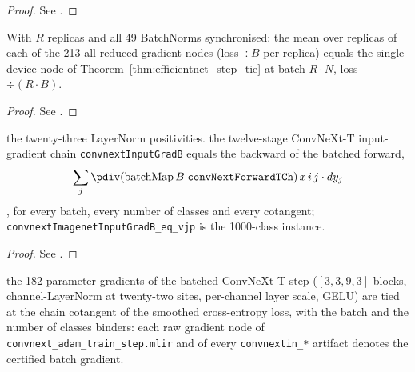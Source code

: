 \begin{proof}
\leanok
See .
\end{proof}

\begin{theorem}
  \label{thm:efficientnet_sync_tie}
  \leanok
  With \(R\) replicas and all 49 BatchNorms synchronised: \Prove{} the mean
  over replicas of each of the 213 all-reduced gradient nodes (loss \(\div B\)
  per replica) equals the single-device node of
  Theorem~\ref{thm:efficientnet_step_tie} at batch \(R \cdot N\), loss
  \(\div (R \cdot B)\).
\end{theorem}

\begin{proof}
\leanok
See .
\end{proof}

\begin{theorem}
  \label{thm:convnext_whole_back}
  \leanok
  \Assume{} the twenty-three LayerNorm positivities. \Prove{} the
  twelve-stage ConvNeXt-T input-gradient chain \texttt{convnextInputGradB}
  equals the backward of the batched forward,
  \[
    \sum_j \pdiv(\mathrm{batchMap}\, B\; \texttt{convNextForwardTCh})\, x\, i\, j
  \cdot dy_j
  \]
  , for every batch, every number of classes and every cotangent;
  \texttt{convnextImagenetInputGradB\_eq\_vjp} is the 1000-class instance.
\end{theorem}

\begin{proof}
\leanok
See .
\end{proof}

\begin{theorem}
  \label{thm:convnext_step_tie}
  \leanok
  \Prove{} the 182 parameter gradients of the batched ConvNeXt-T step
  (\([3, 3, 9, 3]\) blocks, channel-LayerNorm at twenty-two sites, per-channel
  layer scale, GELU) are tied at the chain cotangent of the smoothed
  cross-entropy loss, with the batch and the number of classes binders: each
  raw gradient node of \texttt{convnext\_adam\_train\_step.mlir} and of every
  \texttt{convnextin\_*} artifact denotes the certified batch gradient.
\end{theorem}

